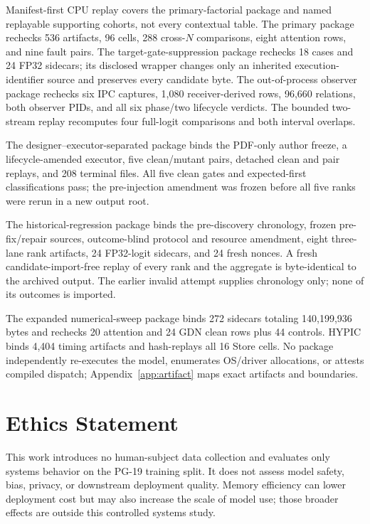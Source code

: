 \documentclass{article}
\begin{document}
Manifest-first CPU replay covers the primary-factorial package and named
replayable supporting cohorts, not every contextual table.  The primary package
rechecks 536 artifacts, 96 cells, 288 cross-$N$ comparisons, eight attention
rows, and nine fault pairs.  The target-gate-suppression package rechecks 18
cases and 24 FP32 sidecars; its disclosed wrapper changes only an inherited
execution-identifier source and preserves every candidate byte.  The
out-of-process observer package rechecks six IPC captures, 1,080
receiver-derived rows, 96,660 relations, both observer PIDs, and all six
phase/two lifecycle verdicts.  The bounded two-stream replay recomputes four
full-logit comparisons and both interval overlaps.

The designer--executor-separated package binds the PDF-only author freeze, a
lifecycle-amended executor, five clean/mutant pairs, detached clean and pair
replays, and 208 terminal files.  All five clean gates and expected-first
classifications pass; the pre-injection amendment was frozen before all five
ranks were rerun in a new output root.

The historical-regression package binds the pre-discovery chronology, frozen
pre-fix/repair sources, outcome-blind protocol and resource amendment, eight
three-lane rank artifacts, 24 FP32-logit sidecars, and 24 fresh nonces.  A fresh
candidate-import-free replay of every rank and the aggregate is byte-identical
to the archived output.  The earlier invalid attempt supplies chronology only;
none of its outcomes is imported.

The expanded numerical-sweep package binds 272 sidecars totaling 140,199,936
bytes and rechecks 20 attention and 24 GDN clean rows plus 44 controls.  HYPIC
binds 4,404 timing artifacts and
hash-replays all 16 Store cells.  No package independently re-executes the
model, enumerates OS/driver allocations, or attests compiled dispatch;
Appendix~\ref{app:artifact} maps exact artifacts and boundaries.

\section{Ethics Statement}

This work introduces no human-subject data collection and evaluates only
systems behavior on the PG-19 training split.  It does not assess model safety,
bias, privacy, or downstream deployment quality.  Memory efficiency can lower
deployment cost but may also increase the scale of model use; those broader
effects are outside this controlled systems study.
\end{document}
